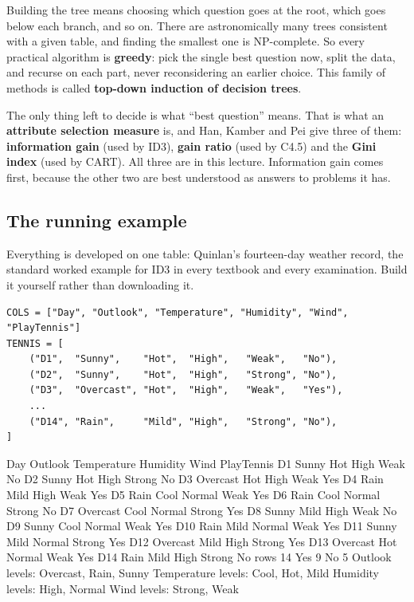 \documentclass[11pt]{article}
\begin{document}
Building the tree means choosing which question goes at the root, which goes
below each branch, and so on. There are astronomically many trees consistent
with a given table, and finding the smallest one is NP-complete. So every
practical algorithm is \textbf{greedy}: pick the single best question now, split
the data, and recurse on each part, never reconsidering an earlier choice.
This family of methods is called \textbf{top-down induction of decision trees}.

The only thing left to decide is what ``best question'' means. That is what an
\textbf{attribute selection measure} is, and Han, Kamber and Pei give three of
them: \textbf{information gain} (used by ID3), \textbf{gain ratio} (used by
C4.5) and the \textbf{Gini index} (used by CART). All three are in this
lecture. Information gain comes first, because the other two are best
understood as answers to problems it has.

\subsection{The running example}
\label{sec:table}

Everything is developed on one table: Quinlan's fourteen-day weather record,
the standard worked example for ID3 in every textbook and every examination.
Build it yourself rather than downloading it.

\begin{lstlisting}
COLS = ["Day", "Outlook", "Temperature", "Humidity", "Wind", "PlayTennis"]
TENNIS = [
    ("D1",  "Sunny",    "Hot",  "High",   "Weak",   "No"),
    ("D2",  "Sunny",    "Hot",  "High",   "Strong", "No"),
    ("D3",  "Overcast", "Hot",  "High",   "Weak",   "Yes"),
    ...
    ("D14", "Rain",     "Mild", "High",   "Strong", "No"),
]
\end{lstlisting}
\begin{codeout}
Day  Outlook   Temperature  Humidity Wind    PlayTennis
D1   Sunny     Hot          High    Weak    No
D2   Sunny     Hot          High    Strong  No
D3   Overcast  Hot          High    Weak    Yes
D4   Rain      Mild         High    Weak    Yes
D5   Rain      Cool         Normal  Weak    Yes
D6   Rain      Cool         Normal  Strong  No
D7   Overcast  Cool         Normal  Strong  Yes
D8   Sunny     Mild         High    Weak    No
D9   Sunny     Cool         Normal  Weak    Yes
D10  Rain      Mild         Normal  Weak    Yes
D11  Sunny     Mild         Normal  Strong  Yes
D12  Overcast  Mild         High    Strong  Yes
D13  Overcast  Hot          Normal  Weak    Yes
D14  Rain      Mild         High    Strong  No
rows 14   Yes 9   No 5
Outlook      levels: Overcast, Rain, Sunny
Temperature  levels: Cool, Hot, Mild
Humidity     levels: High, Normal
Wind         levels: Strong, Weak
\end{codeout}
\end{document}
